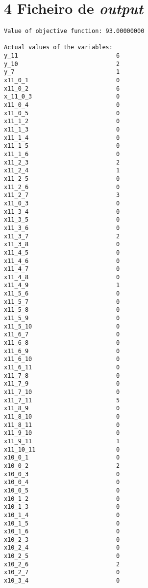 \documentclass[a4paper,12pt]{article}
\begin{document}
\section*{4 Ficheiro de \textit{output}}

\begin{lstlisting}
Value of objective function: 93.00000000

Actual values of the variables:
y_11                            6
y_10                            2
y_7                             1
x11_0_1                         0
x11_0_2                         6
x_11_0_3                        0
x11_0_4                         0
x11_0_5                         0
x11_1_2                         0
x11_1_3                         0
x11_1_4                         0
x11_1_5                         0
x11_1_6                         0
x11_2_3                         2
x11_2_4                         1
x11_2_5                         0
x11_2_6                         0
x11_2_7                         3
x11_0_3                         0
x11_3_4                         0
x11_3_5                         0
x11_3_6                         0
x11_3_7                         2
x11_3_8                         0
x11_4_5                         0
x11_4_6                         0
x11_4_7                         0
x11_4_8                         0
x11_4_9                         1
x11_5_6                         0
x11_5_7                         0
x11_5_8                         0
x11_5_9                         0
x11_5_10                        0
x11_6_7                         0
x11_6_8                         0
x11_6_9                         0
x11_6_10                        0
x11_6_11                        0
x11_7_8                         0
x11_7_9                         0
x11_7_10                        0
x11_7_11                        5
x11_8_9                         0
x11_8_10                        0
x11_8_11                        0
x11_9_10                        0
x11_9_11                        1
x11_10_11                       0
x10_0_1                         0
x10_0_2                         2
x10_0_3                         0
x10_0_4                         0
x10_0_5                         0
x10_1_2                         0
x10_1_3                         0
x10_1_4                         0
x10_1_5                         0
x10_1_6                         0
x10_2_3                         0
x10_2_4                         0
x10_2_5                         0
x10_2_6                         2
x10_2_7                         0
x10_3_4                         0

\end{lstlisting}
\end{document}
